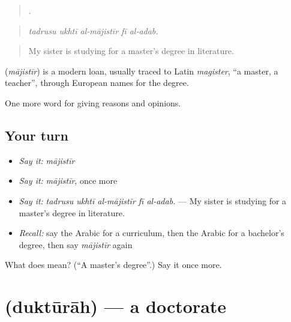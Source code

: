 \begin{quote}
    .
\end{quote}

\begin{quote}
\emph{tadrusu ukhtī al-mājistīr fī al-adab.}
\end{quote}

\begin{quote}
My sister is studying for a master's degree in literature.
\end{quote}

\begin{cousinweb}
\textbf{} (\emph{mājistīr}) is a modern loan, usually traced to Latin \emph{magister}, \textquotedblleft{}a master, a teacher\textquotedblright{}, through European names for the degree.
\end{cousinweb}

\begin{grammarlens}[title={What you've built}]
One more word for giving reasons and opinions.
\end{grammarlens}

\subsection*{Your turn}
\begin{itemize}
\raggedright
  \item \emph{Say it:} \emph{mājistīr}
  \item \emph{Say it:} \emph{mājistīr}, once more
  \item \emph{Say it:} \emph{tadrusu ukhtī al-mājistīr fī al-adab.} — My sister is studying for a master's degree in literature.
  \item \emph{Recall:} say the Arabic for a curriculum, then the Arabic for a bachelor's degree, then say \emph{mājistīr} again
\end{itemize}

\begin{tcolorbox}[breakable,colback=teal!4,colframe=teal!35!black,title={Before you move on}]
What does  mean? (\textquotedblleft{}A master's degree\textquotedblright{}.) Say it once more.
\end{tcolorbox}
\section[\texorpdfstring{\ar{دكتوراه} (duktūrāh)}{دكتوراه (duktūrāh)}]{ (duktūrāh) — a doctorate}


